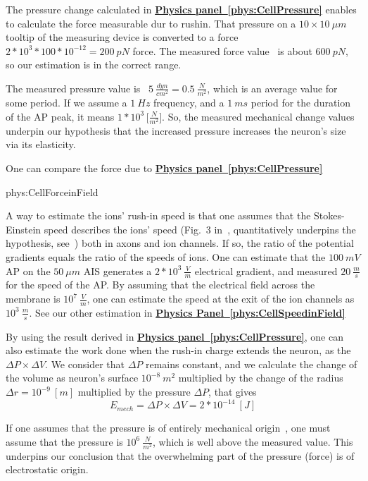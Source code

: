 {
The pressure change calculated in \textbf{\hyperlink{phys:CellPressure}{Physics panel~\ref{phys:CellPressure}}} enables to calculate
the force measurable dur to rushin.
	That pressure on a $10\times10~\mu m$ tooltip of the measuring device is converted to a force
	$2*10^{3}*100*10^{-12} = 200~pN$ force. The measured force value~\cite{MechanicalPropertiesNerves:2025} is about $600~pN$,
	so our estimation is in the correct range. 
	
	The measured pressure value is~\cite{PressureChangeActionPotentialMeasured:1980} $5\ \frac{dyn}{cm^2} = 0.5\ \frac{N}{m^2}$, which is an average value
	for some period. If we assume a $1~Hz$ frequency, and a $1~ms$
	period for the duration of the \gls{AP} peak, it means $1*10^{3}\, \bigl[\frac{N}{m^2}\bigr]$.
	So, the measured mechanical change values~\cite{NeuronalDeformation:2020} underpin our hypothesis that the increased pressure increases the neuron's size via its elasticity.
}

{
One can compare the force due to \textbf{\hyperlink{phys:CellPressure}{Physics panel~\ref{phys:CellPressure}}}

{phys:CellForceinField}

}

{
	A way to estimate the ions' rush-in speed is 
	that one assumes that the Stokes-Einstein speed describes
	the ions' speed (Fig.~3 in~\cite{HodgkinHuxley:1952}, quantitatively underpins the hypothesis, see~\cite{VeghStokesEinstein:2026}) both in axons and ion channels. If so,
	the ratio of the potential gradients equals the ratio of the 
	speeds of ions. One can estimate that the $100~mV$ \gls{AP} on the 
	$50~\mu m$ \gls{AIS} generates a $2*10^3~\frac{V}{m}$ electrical gradient, and
	\cite{HodgkinHuxley:1952} measured $20~\frac{m}{s}$ for the speed of the \gls{AP}. By assuming that the electrical field across the membrane is $10^7~\frac{V}{m}$, one can estimate the speed at the exit of the ion channels as $10^3~\frac{m}{s}$.
	See our other estimation in
	\textbf{\hyperlink{phys:CellSpeedinField}{Physics Panel~\ref{phys:CellSpeedinField}}}
}


{
By using the result derived in \textbf{\hyperlink{phys:CellPressure}{Physics panel~\ref{phys:CellPressure}}},
	one can also estimate the work done when the rush-in charge
	extends the neuron, as the $\Delta P\times\Delta V$. We consider that $\Delta P$ remains constant, and we calculate the change of the volume as neuron's surface $10^{-8}\ m^2$ multiplied by 
	the change of the radius $\Delta r=10^{-9}\ [m]$ multiplied by the pressure $\Delta P$, that gives
\[	
	 E_{mech}= \Delta P\times\Delta V = 2*10^{-14}\ [J]
\]
	 
	If one assumes that the pressure is of entirely mechanical origin~\cite{NeuronalDeformation:2020}, one must assume that the 
	pressure is $10^6~\frac{N}{m^2}$, which is well above the measured value. This underpins our conclusion that the overwhelming part of the pressure (force) is of electrostatic origin.
	}
	
